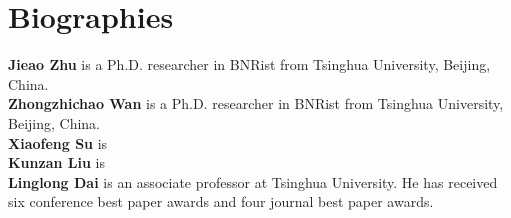 \documentclass[journal,twocolumn]{IEEEtran}
\begin{document}
\footnotesize




\normalsize
\section*{Biographies}

{\bf Jieao Zhu} is a Ph.D. researcher in BNRist from Tsinghua University, Beijing, China.
\\

{\bf Zhongzhichao Wan} is a Ph.D. researcher in BNRist from Tsinghua University, Beijing, China.
\\

{\bf Xiaofeng Su} is 
\\

{\bf Kunzan Liu} is 
\\

{\bf Linglong Dai} is an associate professor at Tsinghua University. He has received six conference best paper awards and four journal best paper awards. 
\end{document}
